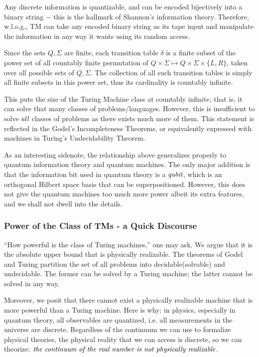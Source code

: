 \documentclass[12pt]{article}  %
\begin{document}
Any discrete information is quantizable, and can be encoded bijectively into a binary string $-$ this is the hallmark of Shannon's information theory. Therefore, w.l.o.g., TM can take any encoded binary string as its tape input and manipulate the information in any way it wants using its random access. 

Since the sets $Q, \Sigma$ are finite, each transition table $\delta$ is a finite subset of the power set of all countably finite permutation of $Q \times \Sigma \mapsto Q \times \Sigma \times \{L, R\}$, taken over all possible sets of $Q, \Sigma$. The collection of all such transition tables is simply all finite subsets in this power set, thus its cardinality is countably infinite.

This puts the size of the Turing Machine class at countably infinite, that is, it can solve that many classes of problems/languages. However, this is insufficient to solve $\emph{all}$ classes of problems as there exists much more of them. This statement is reflected in the Godel's Incompleteness Theorems, or equivalently expressed with machines in Turing's Undecidability Theorem.

As an interesting sidenote, the relationship above generalizes properly to quantum information theory and quantum machines. The only major addition is that the information bit used in quantum theory is a $\emph{qubit}$, which is an orthogonal Hilbert space basis that can be superpositioned. However, this does not give the quantum machines too much more power albeit its extra features, and we shall not dwell into the details.





\subsubsection{Power of the Class of TMs - a Quick Discourse}
``How powerful is the class of Turing machines,'' one may ask. We argue that it is the absolute upper bound that is physically realizable. The theorems of Godel and Turing partition the set of all problems into decidable(solvable) and undecidable. The former can be solved by a Turing machine; the latter cannot be solved in any way.

Moreover, we posit that there cannot exist a physically realizable machine that is more powerful than a Turing machine. Here is why: in physics, especially in quantum theory, all observables are quantized, i.e. all measurements in the universe are discrete. Regardless of the continuum we can use to formalize physical theories, the physical reality that we can access is discrete, so we can theorize: $\emph{the continuum of the real number is not physically realizable}$.
\end{document}
